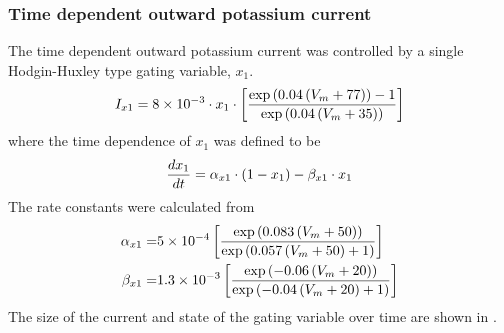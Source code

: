 \subsubsection{Time dependent outward potassium current}
The time dependent outward potassium current was controlled by a single
Hodgin-Huxley type gating variable, $x_1$.
\begin{equation}
  I_{x1}=8\times 10^{-3}\cdot x_1\cdot \left[ \dfrac{\exp\left( 0.04\left( V_m+77 \right) \right)-1}
    {\exp\left( 0.04\left( V_m+35 \right) \right)} \right]
\end{equation}
where the time dependence of $x_1$ was defined to be 
\begin{equation}
   \dfrac{ d x_1}{d t} =\alpha_{x1}\cdot\left( 1-x_1 \right)-\beta_{x1}\cdot x_1
\end{equation}
The rate constants were calculated from
\begin{align}
  \alpha_{x1} =& 5\times 10^{-4}\left[ \dfrac{\exp\left( 0.083\left( V_m+50 \right) \right)}
    {\exp\left( 0.057\left( V_m+50 \right)+1 \right)} \right] \\
  \beta_{x1} =& 1.3\times 10^{-3}\left[ \dfrac{\exp\left( -0.06\left( V_m+20 \right) \right)}
    {\exp\left( -0.04\left( V_m+20 \right)+1 \right)} \right]
\end{align}
The size of the current and state of the gating variable over time are shown
in .
